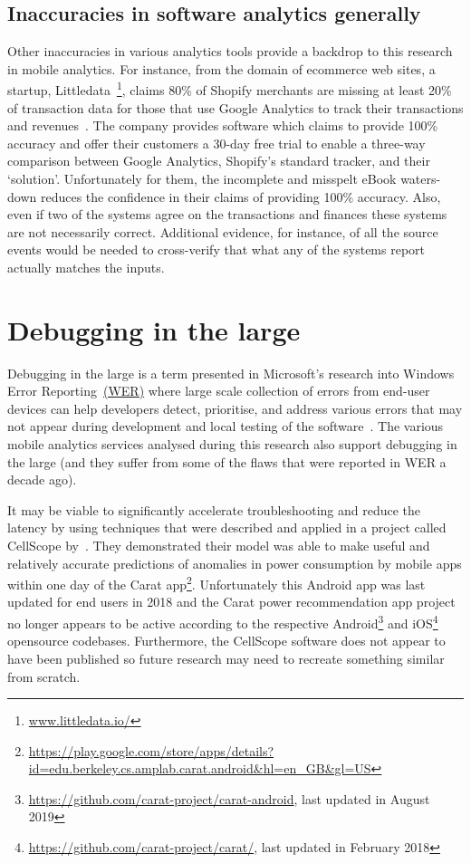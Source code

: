 \subsection{Inaccuracies in software analytics generally}
Other inaccuracies in various analytics tools provide a backdrop to this research in mobile analytics. For instance, from the domain of ecommerce web sites, a startup, Littledata~\footnote{\href{https://www.littledata.io/}{www.littledata.io/}}, claims 80\% of Shopify merchants are missing at least 20\% of transaction data for those that use Google Analytics to track their transactions and revenues~\citep{littledata2020_google_analytics_doesnt_match_shopify}. The company provides software which claims to provide 100\% accuracy and offer their customers a 30-day free trial to enable a three-way comparison between Google Analytics, Shopify's standard tracker, and their `solution'. Unfortunately for them, the incomplete and misspelt eBook waters-down reduces the confidence in their claims of providing 100\% accuracy. Also, even if two of the systems agree on the transactions and finances these systems are not necessarily correct. Additional evidence, for instance, of all the source events would be needed to cross-verify that what any of the systems report actually matches the inputs.

\section{Debugging in the large}
Debugging in the large is a term presented in Microsoft's research into Windows Error Reporting~\href{glossary-wer}{(WER)} where large scale collection of errors from end-user devices can help developers detect, prioritise, and address various errors that may not appear during development and local testing of the software~\citep{kinshuman2011_debugging_in_the_very_large}. The various mobile analytics services analysed during this research also support debugging in the large (and they suffer from some of the flaws that were reported in WER a decade ago). 

It may be viable to significantly accelerate troubleshooting and reduce the latency by using techniques that were described and applied in a project called CellScope by~\citealp{padmanabha2018_mitigating_the_latency_accuracy_tradeoff_in_moile_data_analytics_systems}. They demonstrated their model was able to make useful and relatively accurate predictions of anomalies in power consumption by mobile apps within one day of the Carat app\footnote{\url{https://play.google.com/store/apps/details?id=edu.berkeley.cs.amplab.carat.android&hl=en_GB&gl=US}}. Unfortunately this Android app was last updated for end users in 2018 and the Carat power recommendation app project no longer appears to be active according to the respective Android\footnote{\url{https://github.com/carat-project/carat-android}, last updated in August 2019} and iOS\footnote{\url{https://github.com/carat-project/carat/}, last updated in February 2018} opensource codebases. Furthermore, the CellScope software does not appear to have been published so future research may need to recreate something similar from scratch.

